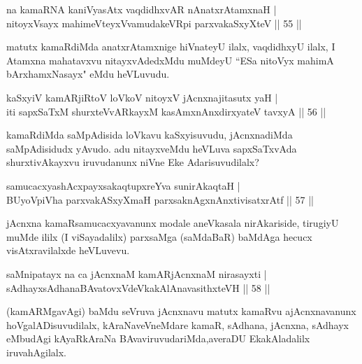 
\begin{shl}
na kamaRNA kaniVyasAtx vaqdidhxvAR nAnatxrAtamxnaH |\\
nitoyxV\s sayx mahimeVteyxVvamudakeVR\s pi parxvakaSxyXteV \hfill || 55 ||
\end{shl}

\begin{artha}
matutx kamaRdiMda anatxrAtamxnige hiVnateyU ilalx, vaqdidhxyU ilalx, I Atamxna mahatavxvu nitayxvAdedxMdu muMdeyU ``ESa nitoVyx mahimA bArxhamxNasayx" eMdu heVLuvudu.
\end{artha}


\begin{shl}
kaSxyiV kamARjiRtoV loVkoV nitoyxV jAcnxnajitasutx yaH |\\
iti sapxSaTxM shurxteVvARkayxM kasAmxnAnx\s \s dirxyateV tavxyA \hfill || 56 ||
\end{shl}

\begin{artha}
kamaRdiMda saMpAdisida loVkavu kaSxyisuvudu, jAcnxnadiMda saMpAdisidudx yAvudo. 
adu nitayxveMdu heVLuva sapxSaTxvAda shurxtivAkayxvu iruvudanunx niVne Eke Adarisuvudilalx?
\end{artha}

\begin{shl}
samucacxyashAcxpayxsakaqtupxreYva sunirAkaqtaH |\\
BUyoV\s piVha parxvakASxyXmaH parxsaknAgxnAnxtivisatxrAtf \hfill || 57 ||
\end{shl}

\begin{artha}
jAcnxna kamaRsamucacxyavanunx  modale aneVkasala nirAkariside, tirugiyU muMde ililx (I viSayadalilx) parxsaMga (saMdaBaR) baMdAga hecucx visAtxravilalxde heVLuvevu.
\end{artha}


\begin{shl}
saMnipatayx na ca jAcnxnaM kamARjAcnxnaM nirasayxti |\\
sAdhayxsAdhanaBAvatovxVdeVkakAlAnavasithxteVH \hfill || 58 ||
\end{shl}

\begin{artha} 
(kamARMgavAgi) baMdu seVruva jAcnxnavu matutx kamaRvu ajAcnxnavanunx hoVgalADisuvudilalx, kAraNaveVneMdare kamaR, sAdhana, jAcnxna, sAdhayx eMbudAgi kAyaRkAraNa BAvaviruvudariMda,\break averaDU EkakAladalilx iruvahAgilalx.
\end{artha}

